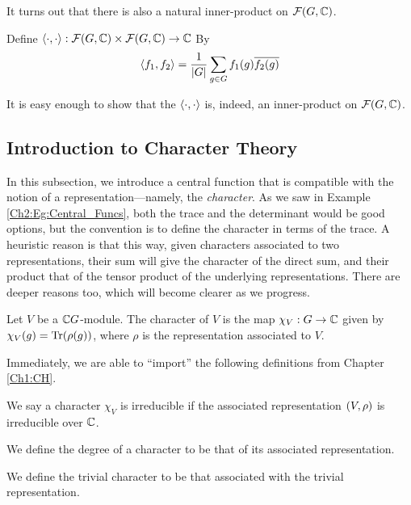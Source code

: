 It turns out that there is also a natural inner-product on $\mathcal{F}\!\left( G, \mathbb{C} \right)$.

\begin{definition}
    Define $\left\langle \cdot, \cdot \right\rangle : \mathcal{F}\!\left( G, \mathbb{C} \right) \times \mathcal{F}\!\left( G, \mathbb{C} \right) \to \mathbb{C}$ By
    \begin{align}
        \left\langle f_1, f_2 \right\rangle = \frac{1}{\left\lvert G \right\rvert} \sum_{g \in G} f_1(g) \overline{f_2(g)}
    \end{align}
\end{definition}

It is easy enough to show that the $\left\langle \cdot, \cdot \right\rangle$ is, indeed, an inner-product on $\mathcal{F}\!\left( G, \mathbb{C} \right)$.

\subsection{Introduction to Character Theory}

In this subsection, we introduce a central function that is compatible with the notion of a representation---namely, the \textit{character}. As we saw in Example \ref{Ch2:Eg:Central_Funcs}, both the trace and the determinant would be good options, but the convention is to define the character in terms of the trace. A heuristic reason is that this way, given characters associated to two representations, their sum will give the character of the direct sum, and their product that of the tensor product of the underlying representations. There are deeper reasons too, which will become clearer as we progress.

\begin{boxdefinition}[Character]
    Let $V$ be a $\mathbb{C} G$-module. The character of $V$ is the map $\chi_V : G \to \mathbb{C}$ given by $\chi_V(g) = \operatorname{Tr}\!\left( \rho(g) \right)$, where $\rho$ is the representation associated to $V$.
\end{boxdefinition}

Immediately, we are able to ``import'' the following definitions from Chapter \ref{Ch1:CH}.

\begin{definition}[Irreducibility]
    We say a character $\chi_V$ is irreducible if the associated representation $\left( V, \rho \right)$ is irreducible over $\mathbb{C}$.
\end{definition}
\begin{definition}[Degree]
    We define the degree of a character to be that of its associated representation.
\end{definition}
\begin{definition}
    We define the trivial character to be that associated with the trivial representation.
\end{definition}

